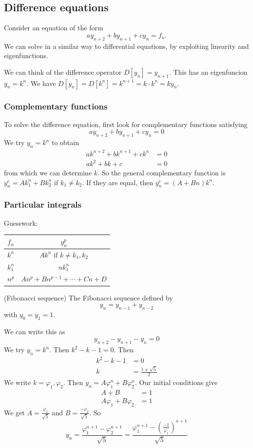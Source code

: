 \documentclass[a4paper]{article}
\begin{document}
\subsection{Difference equations}
Consider an equation of the form
\[
a y_{n + 2} + by_{n + 1} + cy_n = f_n.
\]
We can solve in a similar way to differential equations, by exploiting linearity and eigenfunctions.

We can think of the difference operator $D[y_n] = y_{n + 1}$. This has an eigenfuncion $y_n = k^n$. We have $D[y_n] = D[k^n] = k^{n + 1} = k\cdot k^n = ky_n$.

\subsubsection{Complementary functions}
To solve the difference equation, first look for complementary functions satisfying
\[
ay_{n + 2} + by_{n + 1} + cy_n = 0
\]
We try $y_n = k^n$ to obtain
\begin{align*}
  ak^{n + 2} + bk^{n + 1} + ck^n &= 0\\
  ak^2 + bk + c &= 0
\end{align*}
from which we can determine $k$. So the general complementary function is $y_n^c = Ak_1^n + Bk_2^n$ if $k_1 \not= k_2$. If they are equal, then $y_n^c = (A + Bn)k^n$.
\subsubsection{Particular integrals}
Guesswork:

\vspace{4pt}
\noindent\begin{tabular}{cc}
\toprule
$f_n$ & $y_n^p$\\
\midrule
$k^n$ & $Ak^n$ if $k \not= k_1, k_2$\\
$k_1^n$ & $nk_1^n$\\
$n^p$ & $An^p + Bn^{p - 1} + \cdots + Cn + D$\\
\bottomrule
\end{tabular}

\begin{eg}
  (Fibonacci sequence) The Fibonacci sequence defined by
  \[
  y_n = y_{n - 1} + y_{n - 2}
  \]
  with $y_0 = y_1 = 1$.

  We can write this as
  \[
  y_{n + 2} - y_{n + 1} - y_n = 0
  \]
  We try $y_n = k^n$. Then $k^2 - k - 1 = 0$. Then
  \begin{align*}
    k^2 - k - 1 &= 0\\
    k &= \frac{1 \pm \sqrt{5}}{2}
  \end{align*}
  We write $k = \varphi_1, \varphi_2$. Then $y_n = A\varphi_1^n + B\varphi_2^n$. Our initial conditions give
  \begin{align*}
    A + B &= 1\\
    A\varphi_1 + B\varphi_2 &= 1
  \end{align*}
  We get $\displaystyle A = \frac{\varphi_1}{\sqrt{5}}$ and $\displaystyle B = \frac{-\varphi_2}{\sqrt{5}}$. So
  \[
  y_n = \frac{\varphi_1^{n + 1} - \varphi_2^{n + 1}}{\sqrt{5}} = \frac{\varphi_1^{n + 1} - \left(\frac{-1}{\varphi_1}\right)^{n + 1}}{\sqrt{5}}
  \]
\end{eg}
\end{document}
